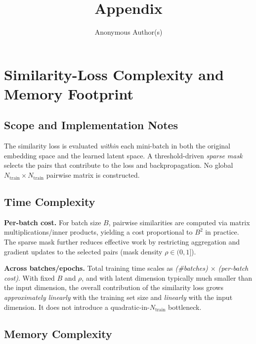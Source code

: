 \documentclass[sigconf,anonymous]{acmart}
\begin{document}
\title{Appendix}

\author{Anonymous Author(s)}

\maketitle


\section{Similarity-Loss Complexity and Memory Footprint}

\label{app:simloss-complexity}
 
\subsection{Scope and Implementation Notes}

The similarity loss is evaluated \emph{within} each mini-batch in both the original embedding space and the learned latent space. A threshold-driven \emph{sparse mask} selects the pairs that contribute to the loss and backpropagation. No global $N_{\text{train}} \times N_{\text{train}}$ pairwise matrix is constructed.
 
\subsection{Time Complexity}

\textbf{Per-batch cost.} For batch size $B$, pairwise similarities are computed via matrix multiplications/inner products, yielding a cost proportional to $B^2$ in practice. The sparse mask further reduces effective work by restricting aggregation and gradient updates to the selected pairs (mask density $\rho \in (0,1]$).
 
\noindent

\textbf{Across batches/epochs.} Total training time scales as \emph{(\#batches) $\times$ (per-batch cost)}. With fixed $B$ and $\rho$, and with latent dimension typically much smaller than the input dimension, the overall contribution of the similarity loss grows \emph{approximately linearly} with the training set size and \emph{linearly} with the input dimension. It does not introduce a quadratic-in-$N_{\text{train}}$ bottleneck.
 
\subsection{Memory Complexity}
\end{document}

